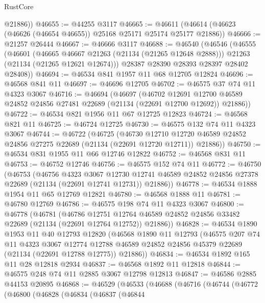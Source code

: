 \begin{lexlean}{RustCore}
\begin{coremodule}
        @21886))
@46655 := @44255 @3117
@46665 := @46611 (@46614 (@46623 (@46626 (@46654 @46655)) @25168 @25171 @25174 @25177 @21886))
@46666 := @21257 @26444
@46667 := @46666 @3117
@46688 := @46540
    (@46546
      (@46555
        (@46601
          (@46665 @46667 @21263 (@21134 (@21265 @12648 @2888)))
          @21263
          (@21134 (@21265 @12621 @12674)))
        @28387
        @28390
        @28393
        @28397
        @28402
        @28408))
@46694 := @46534 @841 @1957 @11 @68 @12705 @12824
@46696 := @46568 @841 @11
@46697 := @46696 @12705
@46702 := @46575 @37 @74 @11 @4323 @3067
@46716 := @46694
    (@46697
      (@46702
        @12691
        @12700
        @46589
        @24852
        @24856
        @27481
        @22689
        (@21134 (@22691 @12700 @12692))
        @21886))
@46722 := @46534 @821 @1956 @11 @67 @12725 @12823
@46724 := @46568 @821 @11
@46725 := @46724 @12725
@46730 := @46575 @132 @74 @11 @4323 @3067
@46744 := @46722
    (@46725
      (@46730
        @12710
        @12720
        @46589
        @24852
        @24856
        @27275
        @22689
        (@21134 (@22691 @12720 @12711))
        @21886))
@46750 := @46534 @831 @1955 @11 @66 @12746 @12822
@46752 := @46568 @831 @11
@46753 := @46752 @12746
@46756 := @46575 @152 @74 @11
@46772 := @46750
    (@46753
      (@46756
        @4323
        @3067
        @12730
        @12741
        @46589
        @24852
        @24856
        @27378
        @22689
        (@21134 (@22691 @12741 @12731))
        @21886))
@46778 := @46534 @1888 @1954 @11 @65 @12769 @12821
@46780 := @46568 @1888 @11
@46781 := @46780 @12769
@46786 := @46575 @198 @74 @11 @4323 @3067
@46800 := @46778
    (@46781
      (@46786
        @12751
        @12764
        @46589
        @24852
        @24856
        @33482
        @22689
        (@21134 (@22691 @12764 @12752))
        @21886))
@46828 := @46534
    @1890
    @1953
    @11
    @40
    @12793
    @12820
    (@46568
      @1890
      @11
      @12793
      (@46575
        @207
        @74
        @11
        @4323
        @3067
        @12774
        @12788
        @46589
        @24852
        @24856
        @45379
        @22689
        (@21134 (@22691 @12788 @12775))
        @21886))
@46834 := @46534 @1892 @165 @11 @28 @12818 @2934
@46837 := @46568 @1892 @11 @12818
@46844 := @46575 @248 @74 @11 @2885 @3067 @12798 @12813
@46847 := @46586 @2885 @44153 @20895
@46868 := @46529
    (@46533
      (@46688
        (@46716
          (@46744
            (@46772
              (@46800
                (@46828
                  (@46834
                    (@46837
                      (@46844

\end{coremodule}
\end{lexlean}
